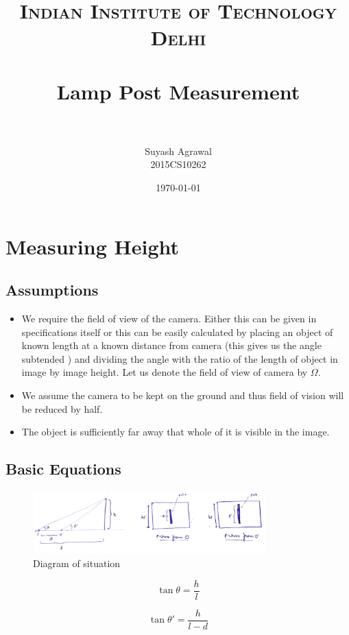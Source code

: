 \documentclass[paper=a4, fontsize=11pt]{scrartcl} %
\title{	
\normalfont \normalsize 
\textsc{Indian Institute of Technology Delhi} \\ [25pt] %
\horrule{0.5pt} \\[0.4cm] %
\huge Lamp Post Measurement \\ %
\horrule{2pt} \\[0.5cm] %
}
\author{Suyash Agrawal \\ 2015CS10262} %
\date{\normalsize\today} %
\begin{document}
\maketitle %

\section{Measuring Height}

\subsection{Assumptions}
\begin{itemize}
\item We require the field of view of the camera. Either this can be given in specifications itself or this can be easily calculated by placing an object of known length at a known distance from camera (this gives us the angle subtended ) and dividing the angle with the ratio of the length of object in image by image height. Let us denote the field of view of camera by $\Omega$.
\item We assume the camera to be kept on the ground and thus field of vision will be reduced by half.
\item The object is sufficiently far away that whole of it is visible in the image.
\end{itemize}

\subsection{Basic Equations}

\begin{figure}[ht!]
		\centering
		\includegraphics[width=0.8\textwidth]{diagram.jpg}
		\caption{Diagram of situation}
		\centering
\end{figure}


\begin{equation} \label{eq1}
  \tan\theta = \frac{h}{l}
\end{equation}

\begin{equation} \label{eq2}
  \tan\theta' = \frac{h}{l-d}
\end{equation}
\end{document}
